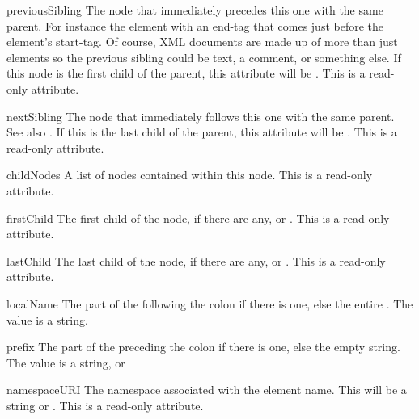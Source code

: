 \begin{memberdesc}[Node]{previousSibling}
The node that immediately precedes this one with the same parent.  For
instance the element with an end-tag that comes just before the
 element's start-tag.  Of course, XML documents are made
up of more than just elements so the previous sibling could be text, a
comment, or something else.  If this node is the first child of the
parent, this attribute will be .
This is a read-only attribute.
\end{memberdesc}

\begin{memberdesc}[Node]{nextSibling}
The node that immediately follows this one with the same parent.  See
also .  If this is the last child of the
parent, this attribute will be .
This is a read-only attribute.
\end{memberdesc}

\begin{memberdesc}[Node]{childNodes}
A list of nodes contained within this node.
This is a read-only attribute.
\end{memberdesc}

\begin{memberdesc}[Node]{firstChild}
The first child of the node, if there are any, or .
This is a read-only attribute.
\end{memberdesc}

\begin{memberdesc}[Node]{lastChild}
The last child of the node, if there are any, or .
This is a read-only attribute.
\end{memberdesc}

\begin{memberdesc}[Node]{localName}
The part of the  following the colon if there is one,
else the entire .  The value is a string.
\end{memberdesc}

\begin{memberdesc}[Node]{prefix}
The part of the  preceding the colon if there is one,
else the empty string.  The value is a string, or 
\end{memberdesc}

\begin{memberdesc}[Node]{namespaceURI}
The namespace associated with the element name.  This will be a
string or .  This is a read-only attribute.
\end{memberdesc}

